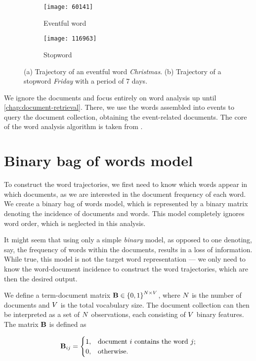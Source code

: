 \begin{figure}
\centering
\begin{subfigure}{.5\textwidth}
  \centering
  \texttt{[image: 60141]}  %
  \caption{Eventful word}
  \label{fig:vanoce}
\end{subfigure}%
\begin{subfigure}{.5\textwidth}
  \centering
  \texttt{[image: 116963]}  %
  \caption{Stopword}
  \label{fig:patek}
\end{subfigure}
\caption{(a) Trajectory of an eventful word \textit{Christmas}. (b) Trajectory of a stopword \textit{Friday} with a period of 7 days.}
\label{fig:eventful-vs-stopword}
\end{figure}

We ignore the documents and focus entirely on word analysis up until \autoref{chap:document-retrieval}. There, we use the words assembled into events to query the document collection, obtaining the event-related documents. The core of the word analysis algorithm is taken from \cite{event-detection}.


\section{Binary bag of words model}
To construct the word trajectories, we first need to know which words appear in which documents, as we are interested in the document frequency of each word. We create a binary bag of words model, which is represented by a binary matrix denoting the incidence of documents and words. This model completely ignores word order, which is neglected in this analysis.

It might seem that using only a simple \textit{binary} model, as opposed to one denoting, say, the frequency of words within the documents, results in a loss of information. While true, this model is not the target word representation --- we only need to know the word-document incidence to construct the word trajectories, which are then the desired output.

We define a term-document matrix $\mathbf{B} \in \left\{ 0, 1 \right\}^{N \times V}$, where $N$ is the number of documents and $V$ is the total vocabulary size. The document collection can then be interpreted as a set of $N$ observations, each consisting of $V$ binary features. The matrix $\mathbf{B}$ is defined as

\begin{equation} \label{eq:bow-matrix}
	\mathbf{B}_{ij} =
	\begin{cases}
		1, & \text{document}~i~\text{contains the word}~j \text{;} \\
		0, & \text{otherwise.}
	\end{cases}
\end{equation}

